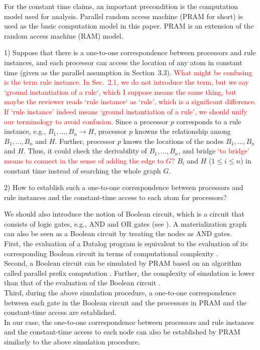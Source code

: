 \documentclass{article}
\begin{document}
For the constant time claims, an important precondition is the
computation model used for analysis. Parallel random access machine
(PRAM for short) is used as the basic computation model in this
paper. PRAM is an extension of the random access machine (RAM) model.

1) Suppose that there is a one-to-one correspondence between
processors and rule instances, and each processor can access the
location of any atom in constant time (given as the parallel
assumption in Section~3.3).  \textcolor{red}{What might be confusing
  is the term rule instance. In Sec.~2.1, we do not introduce the
  term, but we say `ground instantiation of a rule`, which I suppose
  means the same thing, but maybe the reviewer reads `rule instance`
  as `rule', which is a significant difference. If `rule instance'
  indeed means `ground instantiation of a rule', we should unify our
  terminology to avoid confusion. } Since a processor $p$ corresponds
to a rule instance, e.g., $B_1, \ldots, B_n \to H$, processor $p$
knowns the relationship among $B_1, \ldots, B_n$ and $H$. Further,
processor $p$ knows the locations of the nodes $B_1, \ldots, B_n$ and
$H$. Thus, it could check the derivability of $B_1, \ldots, B_n$, and
bridge \textcolor{red}{`to bridge' means to connect in the sense of
  adding the edge to $G$?} $B_i$ and $H$ ($1 \leq i \leq n$) in
constant time instead of searching the whole graph $G$.


2) How to establish such a one-to-one correspondence between processors 
and rule instances and the constant-time access to each atom for processors? 

We should also introduce the notion of Boolean circuit, which is a
circuit that consists of logic gates, e.g., AND and OR gates (see
\cite[Section~2.3]{Raymond95}).  A materialization graph can also be
seen as a Boolean circuit by treating the nodes as AND gates.\\
%
First, the evaluation of a Datalog program is equivalent to the evaluation 
of its corresponding Boolean circuit in terms of computational
complexity \cite{DMRT14a}. \\
%
Second, a Boolean circuit can be simulated by PRAM based on an
algorithm called parallel prefix computation \cite{LaFi80a}.  Further,
the complexity of simulation is lower than that of the evaluation of
the Boolean circuit \cite[Lemma~2.4.1]{Raymond95}.\\
%
Third, during the above simulation procedure, a one-to-one
correspondence between each gate in the Boolean circuit and the
processors in PRAM and the constant-time access are established.\\
%
In our case, the one-to-one correspondence between processors and rule
instances and the constant-time access to each node can also be
established by PRAM similarly to the above simulation procedure.
\end{document}
